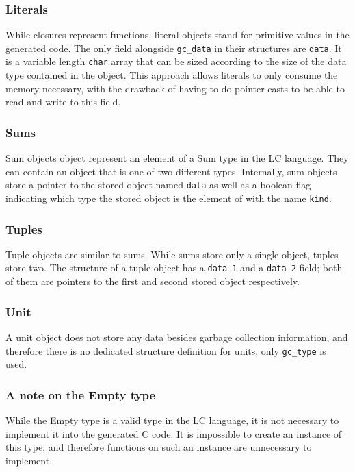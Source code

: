 \documentclass[12pt]{article}
\begin{document}
\subsubsection{Literals} %

While closures represent functions, literal objects stand for primitive values
in the generated code. The only field alongside \verb$gc_data$ in their
structures are \verb$data$. It is a variable length \verb$char$ array that can
be sized according to the size of the data type contained in the object. This
approach allows literals to only consume the memory necessary, with the drawback
of having to do pointer casts to be able to read and write to this field.

\subsubsection{Sums}

Sum objects object represent an element of a Sum type in the LC language. They
can contain an object that is one of two different types. Internally, sum
objects store a pointer to the stored object named \verb$data$ as well as a
boolean flag indicating which type the stored object is the element of with the
name \verb$kind$.

\subsubsection{Tuples}

Tuple objects are similar to sums. While sums store only a single object, tuples
store two. The structure of a tuple object has a \verb$data_1$ and a
\verb$data_2$ field; both of them are pointers to the first and second stored
object respectively.

\subsubsection{Unit}

A unit object does not store any data besides garbage collection information,
and therefore there is no dedicated structure definition for units, only
\verb$gc_type$ is used. 

\subsubsection{A note on the Empty type}

While the Empty type is a valid type in the LC language, it is not necessary to
implement it into the generated C code. It is impossible to create an instance
of this type, and therefore functions on such an instance are unnecessary to
implement.
\end{document}
